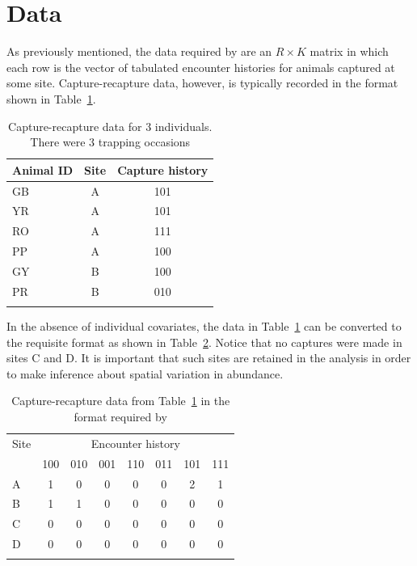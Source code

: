 \documentclass[a4paper]{article}
\begin{document}
\section*{Data}
As previously mentioned, the data required by  are an $R
\times K$
matrix in which each row is the vector of tabulated encounter
histories for animals captured at some site. Capture-recapture data,
however, is typically recorded in the format shown in
Table~\ref{tab:raw}.

\begin{table}[h]
  \footnotesize
  \begin{center}
  \caption{Capture-recapture data for 3 individuals. There were 3
    trapping occasions}
  \vspace{0.3cm}
  \begin{tabular}{lcc}
    \hline
    Animal ID   & Site  & Capture history \\
    \hline
    GB        & A     & 101 \\
    YR        & A     & 101 \\
    RO        & A     & 111 \\
    PP        & A     & 100 \\
    GY        & B     & 100 \\
    PR        & B     & 010 \\
    \hline
  \label{tab:raw}
  \end{tabular}
  \end{center}
\end{table}

In the absence of individual covariates, the data in
Table~\ref{tab:raw} can be converted to the requisite format as shown
in Table~\ref{tab:format}. Notice that no captures were made in sites
C and D. It is important that such sites are retained in the analysis
in order to make inference about spatial variation in abundance.

\begin{table}[h]
  \footnotesize
  \begin{center}
  \caption{Capture-recapture data from Table~\ref{tab:raw} in the
    format required by }
  \vspace{0.3cm}
  \begin{tabular}{lccccccc}
    \hline
    Site  & \multicolumn{7}{c}{Encounter history} \\
    \cline{2-8}
          & 100 & 010 & 001 & 110 & 011 & 101 & 111 \\
    \hline
    A     & 1   & 0   & 0   & 0   & 0   & 2   & 1   \\
    B     & 1   & 1   & 0   & 0   & 0   & 0   & 0   \\
    C     & 0   & 0   & 0   & 0   & 0   & 0   & 0   \\
    D     & 0   & 0   & 0   & 0   & 0   & 0   & 0   \\
    \hline
  \label{tab:format}
  \end{tabular}
  \end{center}
\end{table}
\end{document}
